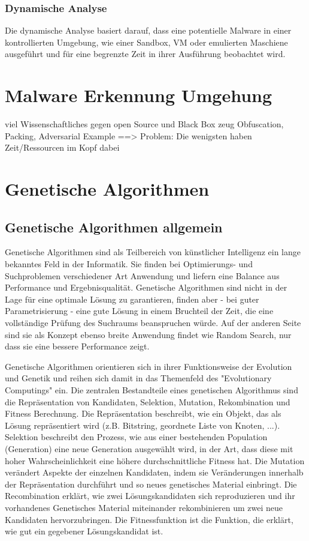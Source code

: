\subsubsection{Dynamische Analyse}
Die dynamische Analyse basiert darauf, dass eine potentielle Malware in einer kontrollierten Umgebung, wie einer Sandbox, VM oder emulierten Maschiene ausgeführt und für eine begrenzte Zeit in ihrer Ausführung beobachtet wird\cite{aboaoja_2023_a}.


\section{Malware Erkennung Umgehung}
viel Wissenschaftliches gegen open Source und Black Box zeug
Obfuscation, Packing, Adversarial Example
==> Problem: Die wenigsten haben Zeit/Ressourcen im Kopf dabei

\section{Genetische Algorithmen}
\subsection{Genetische Algorithmen allgemein}
Genetische Algorithmen sind als Teilbereich von künstlicher Intelligenz ein lange bekanntes Feld in der Informatik. Sie finden bei Optimierungs- und Suchproblemen verschiedener Art Anwendung und liefern eine Balance aus Performance und Ergebnisqualität. Genetische Algorithmen sind nicht in der Lage für eine optimale Lösung zu garantieren, finden aber - bei guter Parametrisierung - eine gute Lösung in einem Bruchteil der Zeit, die eine vollständige Prüfung des Suchraums beanspruchen würde. Auf der anderen Seite sind sie als Konzept ebenso breite Anwendung findet wie Random Search, nur dass sie eine bessere Performance zeigt.

Genetische Algorithmen orientieren sich in ihrer Funktionsweise der Evolution und Genetik und reihen sich damit in das  Themenfeld des "Evolutionary Computings" ein.
Die zentralen Bestandteile eines genetischen Algorithmus sind die Repräsentation von Kandidaten, Selektion, Mutation, Rekombination und Fitness Berechnung. Die Repräsentation beschreibt, wie ein Objekt, das als Lösung repräsentiert wird (z.B. Bitstring, geordnete Liste von Knoten, ...). Selektion beschreibt den Prozess, wie aus einer bestehenden Population (Generation) eine neue Generation ausgewählt wird, in der Art, dass diese mit hoher Wahrscheinlichkeit eine höhere durchschnittliche Fitness hat. Die Mutation verändert Aspekte der einzelnen Kandidaten, indem sie Veränderungen innerhalb der Repräsentation durchführt und so neues genetisches Material einbringt. Die Recombination erklärt, wie zwei Lösungskandidaten sich reproduzieren und ihr vorhandenes Genetisches Material miteinander rekombinieren um zwei neue Kandidaten hervorzubringen. Die Fitnessfunktion ist die Funktion, die erklärt, wie gut ein gegebener Lösungskandidat ist.

